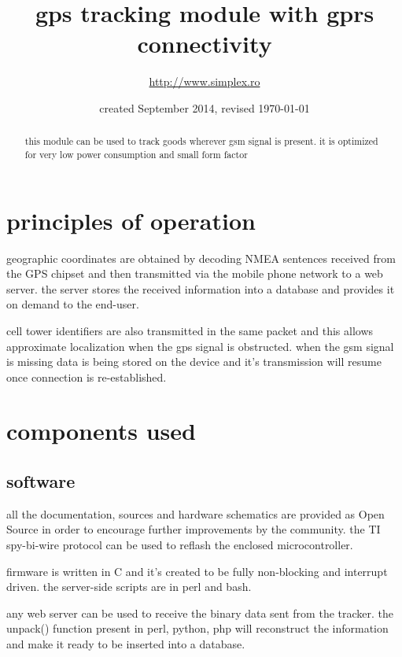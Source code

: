 \documentclass[a4paper,twoside]{refart}
\begin{document}
\title{gps tracking module with gprs connectivity}
\author{\url{http://www.simplex.ro}}
\date{created September 2014, revised \today}
\maketitle

\begin{abstract}
this module can be used to track goods wherever gsm signal is present. it is optimized for very low power consumption and small form factor
\end{abstract}


\tableofcontents
\newpage

\section{principles of operation}
geographic coordinates are obtained by decoding NMEA sentences received from the GPS chipset and then transmitted via the mobile phone network to a web server. the server stores the received information into a database and provides it on demand to the end-user.

cell tower identifiers are also transmitted in the same packet and this allows approximate localization when the gps signal is obstructed. when the gsm signal is missing data is being stored on the device and it's transmission will resume once connection is re-established.


\section{components used}
\subsection{software}

all the documentation, sources and hardware schematics are provided as Open Source in order to encourage further improvements by the community. the TI spy-bi-wire protocol can be used to reflash the enclosed microcontroller.

firmware is written in C and it's created to be fully non-blocking and interrupt driven. the server-side scripts are in perl and bash.

any web server can be used to receive the binary data sent from the tracker. the unpack() function present in perl, python, php will reconstruct the information and make it ready to be inserted into a database.
\end{document}

